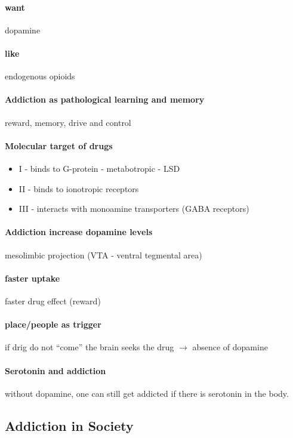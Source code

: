 \documentclass[12pt,article,oneside,a4paper]{memoir}
\begin{document}
\paragraph{want} dopamine
\paragraph{like} endogenous opioids

\paragraph{Addiction as pathological learning and memory} reward, memory, drive and control

\paragraph{Molecular target of drugs}
\begin{itemize}
\item I - binds to G-protein - metabotropic - LSD
\item II - binds to ionotropic receptors
\item III - interacts with monoamine transporters (GABA receptors)
\end{itemize}

\paragraph{Addiction increase dopamine levels} mesolimbic projection (VTA - ventral tegmental area)

\paragraph{faster uptake} faster drug effect (reward)
\paragraph{place/people as trigger} if drig do not ``come'' the brain seeks the drug $\rightarrow$ absence of dopamine

\paragraph{Serotonin and addiction} without dopamine, one can still get addicted if there is serotonin in the body.


\subsection{Addiction in Society}
\end{document}
